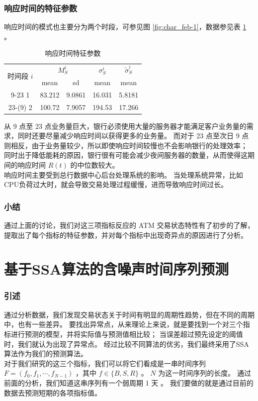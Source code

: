 \documentclass[a4paper]{article}
\begin{document}
\section{响应时间的特征参数}
\indent 响应时间的模式也主要分为两个时段，可参见图 \ref{fig:char_feb-1}，数据参见表 \ref{tab:char_R} 。
\begin{table}[H]
	\centering
	\caption{响应时间特征参数}
	\label{tab:char_R}
	\begin{tabular}{c|cc|c|c}
		\hline
		\multirow{2}{*}{时间段 $i$} & \multicolumn{2}{c}{$M_S^i$} & $\sigma_S^i$ & $\tilde{\sigma}_S^i$ \\
		& mean        & sd            & mean        & mean                 \\
		\hline
		9-23 1                   & 83.212     & 9.0861    & 16.031   & 5.8181            \\
		23-(9) 2                 & 100.72     & 7.9057     & 194.53      & 17.266            \\
		\hline
	\end{tabular}
\end{table}
从 9 点至 23 点业务量巨大，银行必须使用大量的服务器才能满足客户业务量的需求，同时还要尽量减少响应时间以获得更多的业务量。
而对于 23 点至次日 9 点则相反，由于业务量较少，所以即使响应时间较慢也不会影响银行的处理效率；
同时出于降低能耗的原因，银行很有可能会减少夜间服务器的数量，从而使得这期间的响应时间 $R(t)$ 的中位数较大。
\\
\indent 响应时间主要受到总行数据中心后台处理系统的影响。
当处理系统异常，比如CPU负荷过大时，就会导致交易处理过程缓慢，进而导致响应时间过长。

\section*{小结}
通过上面的讨论，我们对这三项指标反应的 ATM 交易状态特性有了初步的了解，提取出了每个指标的特征参数，并对每个指标中出现奇异点的原因进行了分析。

\part{基于SSA算法的含噪声时间序列预测}
\section{引述}
\indent 通过分析数据，我们发现交易状态关于时间有明显的周期性趋势，但在不同的周期中，也有一些差异。
要找出异常点，从来理论上来说，就是要找到一个对三个指标进行预测的模型，并将实际值与预测值相比较；
当误差超过预先设定的阈值时，我们就认为出现了异常点。
经过比较不同算法的优劣，我们最终采用了SSA算法作为我们的预测算法。
\\
\indent 对于我们研究的这三个指标，我们可以将它们看成是一串时间序列 $F=(f_0, f_1, \cdots, f_{N-1})$ ，其中 $f \in \{B, S, R\}$ 。
$N$ 为这一时间序列的长度。
通过前面的分析，我们知道这串序列有一个弱周期 1 天 。
我们要做的就是通过目前的数据去预测短期的各项指标值。
\end{document}
